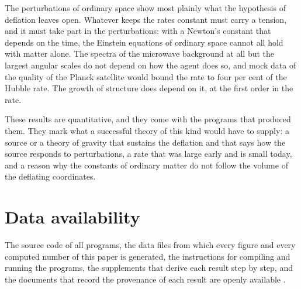The perturbations of ordinary space show most plainly what the hypothesis of deflation leaves open.
Whatever keeps the rates constant must carry a tension, and it must take part in the perturbations:
with a Newton's constant that depends on the time, the Einstein equations of ordinary space cannot
all hold with matter alone. The spectra of the microwave background at all but the largest angular
scales do not depend on how the agent does so, and mock data of the quality of the Planck satellite
would bound the rate to four per cent of the Hubble rate. The growth of structure does depend on it,
at the first order in the rate.

These results are quantitative, and they come with the programs that produced them. They mark what
a successful theory of this kind would have to supply: a source or a theory of gravity that sustains
the deflation and that says how the source responds to perturbations, a rate that was large early
and is small today, and a reason why the constants of ordinary matter do not follow the volume of
the deflating coordinates.

\section*{Data availability}

The source code of all programs, the data files from which every figure and every computed number of
this paper is generated, the instructions for compiling and running the programs, the supplements
that derive each result step by step, and the documents that record the provenance of each result
are openly available \cite{DeflationRepo}.

